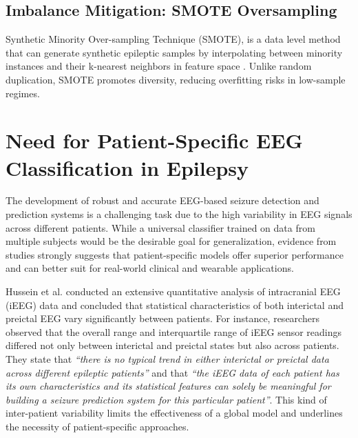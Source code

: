 \documentclass{article}
\begin{document}
				\subsection{Imbalance Mitigation: SMOTE Oversampling}

				Synthetic Minority Over-sampling Technique (SMOTE), 
				is a data level method that can generate synthetic epileptic samples
				by interpolating between minority instances and their k-nearest neighbors in 
				feature space \cite{SMOTEref}. Unlike random duplication, 
				SMOTE promotes diversity, reducing overfitting risks in low-sample regimes. 
				

				\section{Need for Patient-Specific EEG Classification in Epilepsy}
\label{sec:need-patient-specific}

				The development of robust and accurate EEG-based seizure detection 
				and prediction systems is a challenging task due to the high 
				variability in EEG signals across different patients. 
				While a universal classifier trained on data from multiple subjects 
				would be the desirable goal for generalization, 
				evidence from studies strongly suggests that patient-specific 
				models offer superior performance and can better suit 
				for real-world clinical and wearable applications.

				Hussein et al.\cite{hussein} conducted an extensive quantitative analysis of intracranial EEG (iEEG) 
				data and concluded that statistical characteristics 
				of both interictal and preictal EEG vary significantly between patients. 
				For instance, researchers observed that the overall range and interquartile 
				range of iEEG sensor readings differed not only between interictal and preictal 
				states but also across patients. 
				They state that \textit{“there is no typical trend in either interictal or preictal 
				data across different epileptic patients”} and that 
				\textit{“the iEEG data of each patient has its own characteristics 
				and its statistical features can solely be meaningful for building a 
				seizure prediction system for this particular patient”}. 
				This kind of inter-patient variability limits the
				effectiveness of a global model and underlines the necessity of 
				patient-specific approaches.
\end{document}
